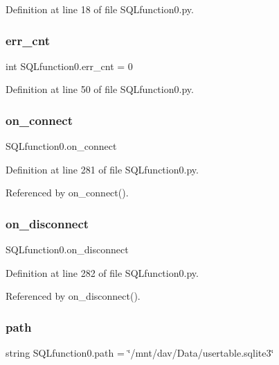 Definition at line 18 of file S\+Q\+Lfunction0.\+py.

\mbox{\label{namespace_s_q_lfunction0_a9f5d5bbdf9858d57e66b899886e2908e}} 
\subsubsection{err\+\_\+cnt}
{\footnotesize\ttfamily int S\+Q\+Lfunction0.\+err\+\_\+cnt = 0}



Definition at line 50 of file S\+Q\+Lfunction0.\+py.

\mbox{\label{namespace_s_q_lfunction0_a8d6be78e5f5a86099dde5f92c140edcc}} 
\subsubsection{on\+\_\+connect}
{\footnotesize\ttfamily S\+Q\+Lfunction0.\+on\+\_\+connect}



Definition at line 281 of file S\+Q\+Lfunction0.\+py.



Referenced by on\+\_\+connect().

\mbox{\label{namespace_s_q_lfunction0_ab6876d03f6bdc93f66d2326e650c7a68}} 
\subsubsection{on\+\_\+disconnect}
{\footnotesize\ttfamily S\+Q\+Lfunction0.\+on\+\_\+disconnect}



Definition at line 282 of file S\+Q\+Lfunction0.\+py.



Referenced by on\+\_\+disconnect().

\mbox{\label{namespace_s_q_lfunction0_af8774bed7222c5e0acc2e01e627ef43b}} 
\subsubsection{path}
{\footnotesize\ttfamily string S\+Q\+Lfunction0.\+path = \char`\"{}/mnt/dav/Data/usertable.\+sqlite3\char`\"{}}




